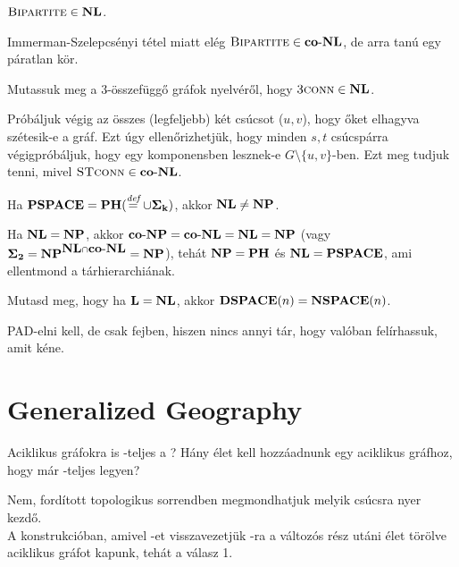 \begin{Exercise}[counter={sorszam}, difficulty=0]
	$\mbox{\sc{Bipartite}} \in \mbox{\ensuremath{\mathbf{NL}}}$. 
\end{Exercise}	
\begin{Answer}
	Immerman-Szelepcsényi t\'etel miatt el\'eg $\mbox{\sc{Bipartite}} \in \mbox{\ensuremath{\mathbf{co\text{-}NL}}}$, de arra tan\'u egy p\'aratlan k\"or.
\end{Answer} 

\begin{Exercise}[counter={sorszam}, difficulty=0]
	Mutassuk meg a $3$-\"osszef\"ugg\H o gr\'afok nyelv\'er\H ol, hogy $\mbox{\sc{3conn}} \in \mbox{\ensuremath{\mathbf{NL}}}$.
\end{Exercise}	
\begin{Answer}
	Pr\'ob\'aljuk v\'egig az \"osszes (legfeljebb) k\'et cs\'ucsot ($u,v$), hogy \H oket elhagyva sz\'etesik-e a gr\'af.
	Ezt \'ugy ellen\H orizhetj\"uk, hogy minden $s,t$ cs\'ucsp\'arra v\'egigpr\'ob\'aljuk, hogy egy komponensben lesznek-e $G\setminus\{u,v\}$-ben.
	Ezt meg tudjuk tenni, mivel $\mbox{\sc{STconn}}\in \mbox{\ensuremath{\mathbf{co\text{-}NL}}}$.
\end{Answer} 

\begin{Exercise}[counter={sorszam}, difficulty=0]
	Ha $\mbox{\ensuremath{\mathbf{PSPACE}}}= \mbox{\ensuremath{\mathbf{PH}}}(\stackrel{\textit{def}}=\cup\mbox{\ensuremath{\mathbf{\Sigma_k}}})$, akkor $\mbox{\ensuremath{\mathbf{NL}}}\ne \mbox{\ensuremath{\mathbf{NP}}}$.
\end{Exercise}	
\begin{Answer}
	Ha $\mbox{\ensuremath{\mathbf{NL}}}=\mbox{\ensuremath{\mathbf{NP}}}$, akkor $\mbox{\ensuremath{\mathbf{co\text{-}NP}}}=\mbox{\ensuremath{\mathbf{co\text{-}NL}}}=\mbox{\ensuremath{\mathbf{NL}}}=\mbox{\ensuremath{\mathbf{NP}}}$ (vagy $\mbox{\ensuremath{\mathbf{\Sigma_2}}}=\mbox{\ensuremath{\mathbf{NP}}}^{\mbox{\ensuremath{\mathbf{NL}}}\cap \mbox{\ensuremath{\mathbf{co\text{-}NL}}}}=\mbox{\ensuremath{\mathbf{NP}}}$), teh\'at $\mbox{\ensuremath{\mathbf{NP}}}=\mbox{\ensuremath{\mathbf{PH}}}$ \'es $\mbox{\ensuremath{\mathbf{NL}}}=\mbox{\ensuremath{\mathbf{PSPACE}}}$, ami ellentmond a t\'arhierarchi\'anak.
\end{Answer} 

\begin{Exercise}[counter={sorszam}, difficulty=0]
	Mutasd meg, hogy ha $\mbox{\ensuremath{\mathbf{L}}}=\mbox{\ensuremath{\mathbf{NL}}}$, akkor $\mbox{\ensuremath{\mathbf{DSPACE}}}(n)=\mbox{\ensuremath{\mathbf{NSPACE}}}(n)$.
\end{Exercise}	
\begin{Answer}
	PAD-elni kell, de csak fejben, hiszen nincs annyi t\'ar, hogy val\'oban fel\'irhassuk, amit k\'ene.
\end{Answer} 

\section{Generalized Geography}

\begin{Exercise}[counter={sorszam}, difficulty=0]
	Aciklikus gr\'afokra is \PSPACE -teljes a ? H\'any \'elet kell hozz\'aadnunk egy aciklikus gr\'afhoz, hogy m\'ar \PSPACE -teljes legyen?
\end{Exercise}	
\begin{Answer}
	Nem, ford\'itott topologikus sorrendben megmondhatjuk melyik cs\'ucsra nyer kezd\H o.\\
	A konstrukci\'oban, amivel -et visszavezetj\"uk -ra a v\'altoz\'os r\'esz ut\'ani \'elet t\"or\"olve aciklikus gr\'afot kapunk, teh\'at a v\'alasz 1.
\end{Answer} 

